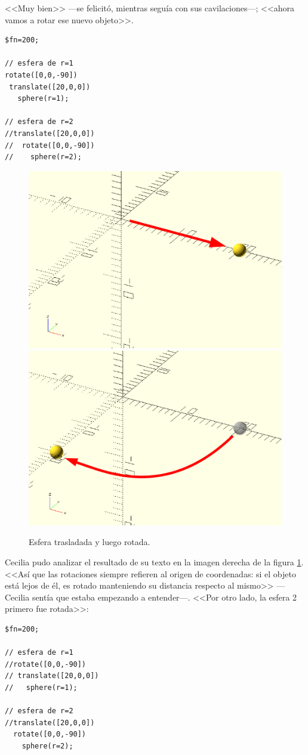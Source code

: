   
    <<Muy bien>> ---se felicitó, mientras seguía con sus
    ca\-vi\-la\-cio\-nes---; <<ahora vamos a rotar ese nuevo objeto>>.

\begin{lstlisting}
$fn=200;
      
// esfera de r=1
rotate([0,0,-90])
 translate([20,0,0])
   sphere(r=1);
   
// esfera de r=2
//translate([20,0,0])
//  rotate([0,0,-90])
//    sphere(r=2);
    \end{lstlisting}%

    \begin{figure}[ht]
      \centering
      \includegraphics[width=.4\textwidth]{imagenes/esfera-trasladada}
      \hspace{.05\textwidth}
    \includegraphics[width=.4\textwidth]{imagenes/esfera-trasladada-y-rotada}     
    \caption{Esfera trasladada y luego rotada.}
    \label{fig:esfera-trasladada-y-rotada}
  \end{figure}
  
    
  Cecilia pudo analizar el resultado de su texto en la imagen derecha
  de la figura \ref{fig:esfera-trasladada-y-rotada}.  <<Así que las
  rotaciones siempre refieren al origen de coordenadas: si el objeto
  está lejos de él, es rotado manteniendo su distancia respecto al
  mismo>> ---Cecilia sentía que estaba empezando a
  en\-ten\-\mbox{der---.} <<Por otro lado, la esfera 2 primero fue
  rotada>>:

    \begin{lstlisting}
$fn=200;
      
// esfera de r=1
//rotate([0,0,-90])
// translate([20,0,0])
//   sphere(r=1);
   
// esfera de r=2
//translate([20,0,0])
  rotate([0,0,-90])
    sphere(r=2);
    \end{lstlisting}%

